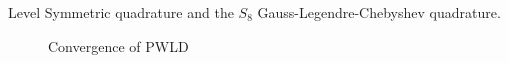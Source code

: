Level Symmetric quadrature and the $S_8$ Gauss-Legendre-Chebyshev quadrature.
\begin{figure}[H]
  \centering
  \caption{Convergence of PWLD}
\end{figure}
